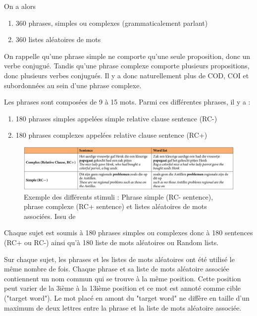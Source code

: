 On a alors 
\begin{enumerate}
    \item 360 phrases, simples ou complexes (grammaticalement parlant)
    \item 360 listes aléatoires de mots 
\end{enumerate}

On rappelle qu'une phrase simple ne comporte qu'une seule proposition, donc un verbe conjugué. Tandis qu'une phrase complexe comporte plusieurs propositions, donc plusieurs verbes conjugués. Il y a donc naturellement plus de COD, COI et subordonnées au sein d'une phrase complexe.

\vspace{2ex}
Les phrases sont composées de 9 à 15 mots. Parmi ces différentes phrases, il y a :
\begin{enumerate}
    \item 180 phrases simples appelées simple relative clause sentence (RC-)
    \item 180 phrases complexes appelées relative clause sentence (RC+)
\end{enumerate}

\begin{figure}[!ht]
    \centering
    \includegraphics[width=20cm]{stimuli.png}
    \caption{Exemple des différents stimuli : Phrase simple (RC- sentence), phrase complexe (RC+ sentence) et listes aléatoires de mots associées. Issu de \cite{4}}
    \label{fig2.2}
\end{figure}

Chaque sujet est soumis à 180 phrases simples ou complexes donc à 180 sentences (RC+ ou RC-) ainsi qu’à 180 liste de mots aléatoires ou Random lists.

\vspace{2ex}
Sur chaque sujet, les phrases et les listes de mots aléatoires ont été utilisé le même nombre de fois.
Chaque phrase et sa liste de mots aléatoire associée contiennent un nom commun qui se trouve à la même position. Cette position peut varier de la 3ième à la 13ième position et ce mot est annoté comme cible ("target word").
Le mot placé en amont du "target word" ne diffère en taille d'un maximum de deux lettres entre la phrase et la liste de mots aléatoire associée.

